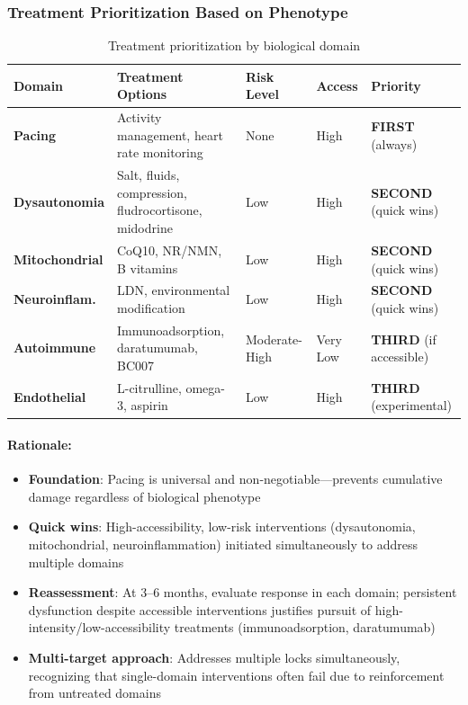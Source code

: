 \subsubsection{Treatment Prioritization Based on Phenotype}

\begin{table}[htbp]
\centering
\caption{Treatment prioritization by biological domain}
\label{tab:treatment-prioritization}
\begin{tabular}{p{3cm}p{4cm}p{2cm}p{2cm}p{2cm}}
\toprule
\textbf{Domain} & \textbf{Treatment Options} & \textbf{Risk Level} & \textbf{Access} & \textbf{Priority} \\
\midrule
\textbf{Pacing} & Activity management, heart rate monitoring & None & High & \textbf{FIRST} (always) \\
\addlinespace
\textbf{Dysautonomia} & Salt, fluids, compression, fludrocortisone, midodrine & Low & High & \textbf{SECOND} (quick wins) \\
\addlinespace
\textbf{Mitochondrial} & CoQ10, NR/NMN, B vitamins & Low & High & \textbf{SECOND} (quick wins) \\
\addlinespace
\textbf{Neuroinflam.} & LDN, environmental modification & Low & High & \textbf{SECOND} (quick wins) \\
\addlinespace
\textbf{Autoimmune} & Immunoadsorption, daratumumab, BC007 & Moderate-High & Very Low & \textbf{THIRD} (if accessible) \\
\addlinespace
\textbf{Endothelial} & L-citrulline, omega-3, aspirin & Low & High & \textbf{THIRD} (experimental) \\
\bottomrule
\end{tabular}
\end{table}

\paragraph{Rationale:}
\begin{itemize}
    \item \textbf{Foundation}: Pacing is universal and non-negotiable---prevents cumulative damage regardless of biological phenotype
    \item \textbf{Quick wins}: High-accessibility, low-risk interventions (dysautonomia, mitochondrial, neuroinflammation) initiated simultaneously to address multiple domains
    \item \textbf{Reassessment}: At 3--6 months, evaluate response in each domain; persistent dysfunction despite accessible interventions justifies pursuit of high-intensity/low-accessibility treatments (immunoadsorption, daratumumab)
    \item \textbf{Multi-target approach}: Addresses multiple locks simultaneously, recognizing that single-domain interventions often fail due to reinforcement from untreated domains
\end{itemize}

